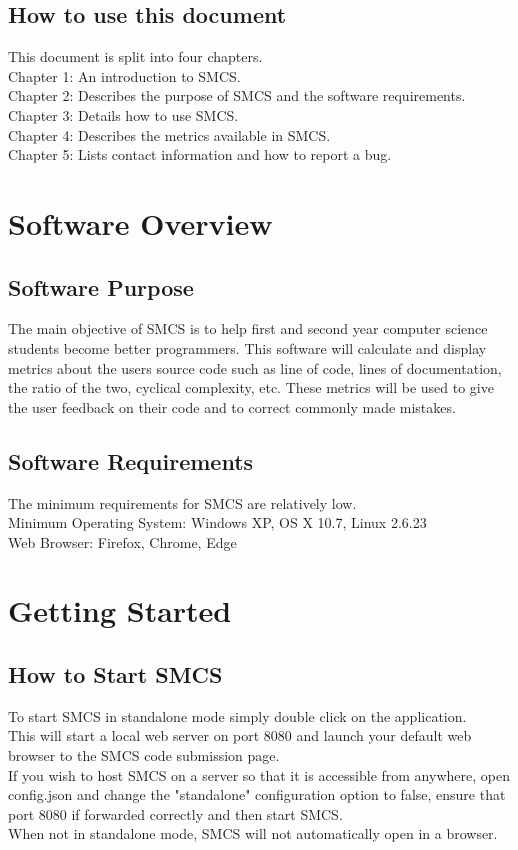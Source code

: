 \documentclass{scrreprt}
\begin{document}
	\section{How to use this document}
	This document is split into four chapters. \\
	Chapter 1: An introduction to SMCS. \\
	Chapter 2: Describes the purpose of SMCS and the software requirements. \\
	Chapter 3: Details how to use SMCS. \\
	Chapter 4: Describes the metrics available in SMCS. \\
	Chapter 5: Lists contact information and how to report a bug.
	
	{\let\clearpage\relax \chapter{Software Overview}}
	
	\section{Software Purpose}
	The main objective of SMCS is to help first and second year computer science students become better programmers.
	This software will calculate and display metrics about the users source code such as line of code, lines of documentation, the ratio of the two, cyclical complexity, etc.
	These metrics will be used to give the user feedback on their code and to correct commonly made mistakes.

	\section{Software Requirements}
	The minimum requirements for SMCS are relatively low.\\
	Minimum Operating System: Windows XP, OS X 10.7, Linux 2.6.23\\
	Web Browser: Firefox, Chrome, Edge\\

	{\let\clearpage\relax \chapter{Getting Started}}
	\section{How to Start SMCS}
	To start SMCS in standalone mode simply double click on the application. \\
	This will start a local web server on port 8080 and launch your default web browser to the SMCS code submission page. \\
	If you wish to host SMCS on a server so that it is accessible from anywhere, open config.json and change the "standalone" configuration option to false, ensure that port 8080 if forwarded correctly and then start SMCS. \\
	When not in standalone mode, SMCS will not automatically open in a browser.
\end{document}
